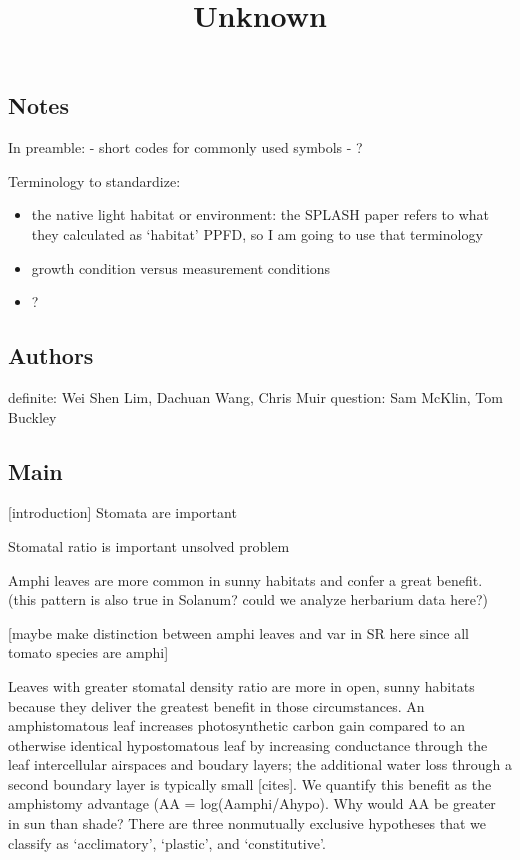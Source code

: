 \documentclass[
  letterpaper,
  DIV=11,
  numbers=noendperiod]{scrartcl}
\title{Unknown}
\author{}
\date{}
\begin{document}
\maketitle

\subsection{Notes}\label{notes}

In preamble: - short codes for commonly used symbols - ?

Terminology to standardize:

\begin{itemize}
\item
  the native light habitat or environment: the SPLASH paper refers to
  what they calculated as `habitat' PPFD, so I am going to use that
  terminology
\item
  growth condition versus measurement conditions
\item
  ?
\end{itemize}

\subsection{Authors}\label{authors}

definite: Wei Shen Lim, Dachuan Wang, Chris Muir question: Sam McKlin,
Tom Buckley

\subsection{Main}\label{main}

{[}introduction{]} Stomata are important

Stomatal ratio is important unsolved problem

Amphi leaves are more common in sunny habitats and confer a great
benefit. (this pattern is also true in Solanum? could we analyze
herbarium data here?)

{[}maybe make distinction between amphi leaves and var in SR here since
all tomato species are amphi{]}

Leaves with greater stomatal density ratio are more in open, sunny
habitats because they deliver the greatest benefit in those
circumstances. An amphistomatous leaf increases photosynthetic carbon
gain compared to an otherwise identical hypostomatous leaf by increasing
conductance through the leaf intercellular airspaces and boudary layers;
the additional water loss through a second boundary layer is typically
small {[}cites{]}. We quantify this benefit as the amphistomy advantage
(AA = log(Aamphi/Ahypo). Why would AA be greater in sun than shade?
There are three nonmutually exclusive hypotheses that we classify as
`acclimatory', `plastic', and `constitutive'.
\end{document}
